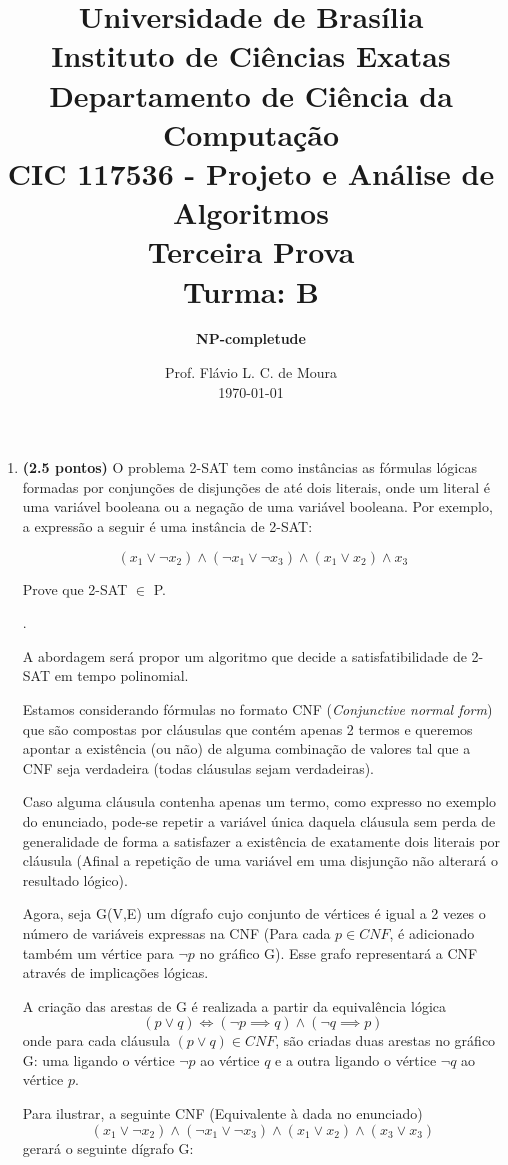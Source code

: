 \documentclass[12pt]{article}
\title{{\large Universidade de Brasília \\ Instituto de Ciências Exatas \\
Departamento de Ciência da Computação} \\[1cm]
CIC 117536 - Projeto e Análise de Algoritmos \\[.5cm]  Terceira Prova \\[.5cm] Turma: B}
\author{{\bf NP-completude}}
\date{Prof. Flávio L. C. de Moura \\[.5cm] \today}
\newcommand{\resposta}[1]{ \noindent {\bf Solução}.{\color{blue} #1}}
\begin{document}
\maketitle

\begin{enumerate}
\item {\bf (2.5 pontos)} O problema 2-SAT tem como instâncias as
  fórmulas lógicas formadas por conjunções de disjunções de até dois
  literais, onde um literal é uma variável booleana ou a negação de
  uma variável booleana. Por exemplo, a expressão a seguir é uma
  instância de 2-SAT:

  $$(x_1\lor \neg x_2)\land (\neg x_1 \lor \neg x_3) \land (x_1 \lor x_2) \land x_3$$

  Prove que 2-SAT $\in$ P.

 
  \resposta{
  
  	A abordagem será propor um algoritmo que decide a satisfatibilidade de 2-SAT em tempo polinomial.
    
  	Estamos considerando fórmulas no formato CNF (\textit{Conjunctive normal form}) que são compostas por cláusulas que contém apenas 2 termos e queremos apontar a existência (ou não) de alguma combinação de valores tal que a CNF seja verdadeira (todas cláusulas sejam verdadeiras).
    
    Caso alguma cláusula contenha apenas um termo, como expresso no exemplo do enunciado, pode-se repetir a variável única daquela cláusula sem perda de generalidade de forma a satisfazer a existência de exatamente dois literais por cláusula (Afinal a repetição de uma variável em uma disjunção não alterará o resultado lógico).
    
    Agora, seja G(V,E) um dígrafo cujo conjunto de vértices é igual a 2 vezes o número de variáveis expressas na CNF (Para cada $p \in CNF$, é adicionado também um vértice para $\neg p$ no gráfico G). Esse grafo representará a CNF através de implicações lógicas.
    
    A criação das arestas de G é realizada a partir da equivalência lógica $$(p \lor q) \iff (\neg p \implies q) \land (\neg q \implies p) $$ onde para cada cláusula $(p \lor q) \in CNF$, são criadas duas arestas no gráfico G: uma ligando o vértice $\neg p$ ao vértice $q$ e a outra ligando o vértice $\neg q$ ao vértice $p$.
    
    Para ilustrar, a seguinte CNF (Equivalente à dada no enunciado) $$(x_1\lor \neg x_2)\land (\neg x_1 \lor \neg x_3) \land (x_1 \lor x_2) \land (x_3 \lor x_3)$$ gerará o seguinte dígrafo G:
  
}
\end{enumerate}
\end{document}

